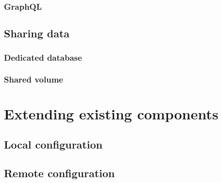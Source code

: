 \subsubsection{GraphQL}
\subsection{Sharing data}
\subsubsection{Dedicated database}
\subsubsection{Shared volume}
\section{Extending existing components}
\subsection{Local configuration}
\subsection{Remote configuration}


